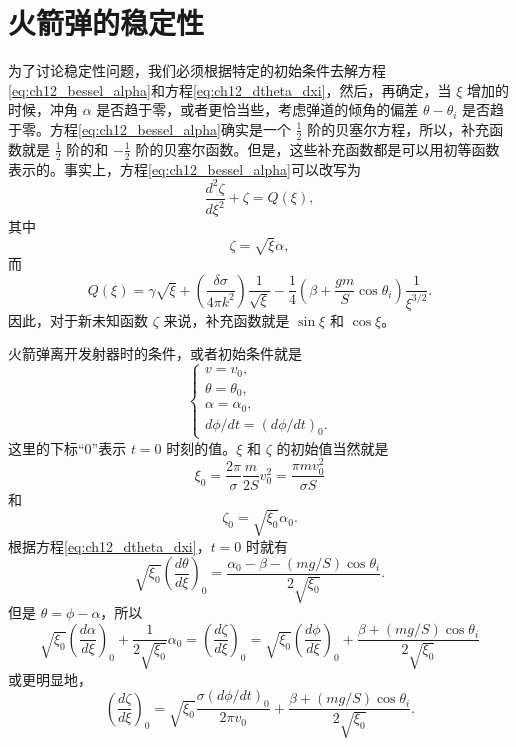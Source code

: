 \section{火箭弹的稳定性}

为了讨论稳定性问题，我们必须根据特定的初始条件去解方程\eqref{eq:ch12_bessel_alpha}和方程\eqref{eq:ch12_dtheta_dxi}，然后，再确定，当 $\xi$ 增加的时候，冲角 $\alpha$ 是否趋于零，或者更恰当些，考虑弹道的倾角的偏差 $\theta - \theta_i$ 是否趋于零。方程\eqref{eq:ch12_bessel_alpha}确实是一个 $\frac{1}{2}$ 阶的贝塞尔方程，所以，补充函数就是 $\frac{1}{2}$ 阶的和 $-\frac{1}{2}$ 阶的贝塞尔函数。但是，这些补充函数都是可以用初等函数表示的。事实上，方程\eqref{eq:ch12_bessel_alpha}可以改写为
\begin{equation}\label{eq:ch12_zeta_eq}
\frac{d^2 \zeta}{d \xi^2} + \zeta = Q(\xi),
\end{equation}
其中
\begin{equation}\label{eq:ch12_zeta_def}
\zeta = \sqrt{\xi} \alpha,
\end{equation}
而
\begin{equation}\label{eq:ch12_Q_def}
Q(\xi) = \gamma \sqrt{\xi} + \left( \frac{\delta \sigma}{4 \pi k^2} \right) \frac{1}{\sqrt{\xi}} - \frac{1}{4} \left( \beta + \frac{gm}{S} \cos \theta_i \right) \frac{1}{\xi^{3/2}}.
\end{equation}
因此，对于新未知函数 $\zeta$ 来说，补充函数就是 $\sin \xi$ 和 $\cos \xi$。

火箭弹离开发射器时的条件，或者初始条件就是
\begin{equation}\label{eq:ch12_initial_conditions}
\begin{cases}
v = v_0, \\
\theta = \theta_0, \\
\alpha = \alpha_0, \\
d\phi/dt = (d\phi/dt)_0.
\end{cases}
\end{equation}
这里的下标“0”表示 $t=0$ 时刻的值。$\xi$ 和 $\zeta$ 的初始值当然就是
\begin{equation}\label{eq:ch12_xi0}
\xi_0 = \frac{2\pi}{\sigma} \frac{m}{2S}v_0^2 = \frac{\pi m v_0^2}{\sigma S}
\end{equation}
和
\begin{equation}\label{eq:ch12_zeta0}
\zeta_0 = \sqrt{\xi_0}\alpha_0.
\end{equation}
根据方程\eqref{eq:ch12_dtheta_dxi}，$t=0$ 时就有
\begin{equation*}
\sqrt{\xi_0}\left(\frac{d\theta}{d\xi}\right)_0 = \frac{\alpha_0 - \beta - (mg/S)\cos\theta_i}{2\sqrt{\xi_0}}.
\end{equation*}
但是 $\theta = \phi - \alpha$，所以
\begin{equation*}
\sqrt{\xi_0}\left(\frac{d\alpha}{d\xi}\right)_0 + \frac{1}{2\sqrt{\xi_0}}\alpha_0 = \left(\frac{d\zeta}{d\xi}\right)_0 = \sqrt{\xi_0}\left(\frac{d\phi}{d\xi}\right)_0 + \frac{\beta + (mg/S)\cos\theta_i}{2\sqrt{\xi_0}}
\end{equation*}
或更明显地，
\begin{equation}\label{eq:ch12_dzeta0}
\left(\frac{d\zeta}{d\xi}\right)_0 = \sqrt{\xi_0}\frac{\sigma(d\phi/dt)_0}{2\pi v_0} + \frac{\beta + (mg/S)\cos\theta_i}{2\sqrt{\xi_0}}.
\end{equation}

